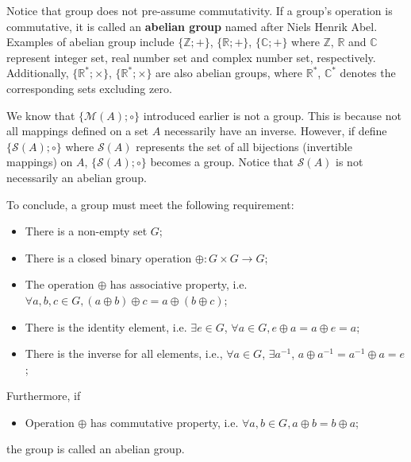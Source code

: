 Notice that group does not pre-assume commutativity. If a group's operation is commutative, it is called an \textbf{abelian group} named after Niels Henrik Abel. Examples of abelian group include $\{\mathbb{Z}; +\}$, $\{\mathbb{R}; +\}$, $\{\mathbb{C}; +\}$ where $\mathbb{Z}$, $\mathbb{R}$ and $\mathbb{C}$ represent integer set, real number set and complex number set, respectively. Additionally, $\{\mathbb{R}^{*}; \times \}$, $\{\mathbb{R}^{*}; \times \}$ are also abelian groups, where $\mathbb{R}^*$,  $\mathbb{C}^*$ denotes the corresponding sets excluding zero.

We know that $\{\mathcal{M}(A); \circ\}$ introduced earlier is not a group. This is because not all mappings defined on a set $A$ necessarily have an inverse. However, if define $\{\mathcal{S}(A); \circ\}$ where $\mathcal{S}(A)$ represents the set of all  bijections (invertible mappings) on $A$, $\{\mathcal{S}(A); \circ\}$ becomes a group. Notice that $\mathcal{S}(A)$ is not necessarily an abelian group.

To conclude, a group must meet the following requirement:
\begin{itemize}
	\item There is a non-empty set $G$;
	\item There is a closed binary operation $\oplus: G\times G \rightarrow G$;
	\item The operation $\oplus$ has associative property, i.e. $\forall a, b, c \in G, (a \oplus b) \oplus c = a\oplus (b \oplus c)$;
	\item There is the identity element, i.e. $\exists e\in G$, $\forall a \in G, e\oplus a = a \oplus e = a$;
	\item There is the inverse for all elements, i.e., $\forall a\in G$, $\exists a^{-1}$, $a\oplus a^{-1} = a^{-1}\oplus a = e$;
\end{itemize}
Furthermore, if
\begin{itemize}
	\item Operation $\oplus$ has commutative property, i.e. $\forall a, b\in G, a\oplus b=b\oplus a$;
\end{itemize}
the group is called an abelian group.

